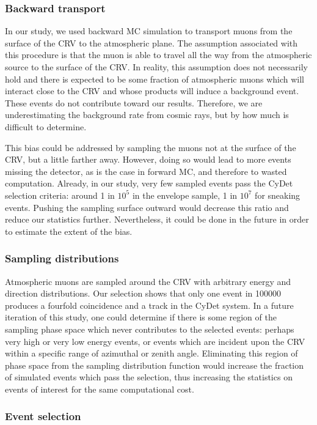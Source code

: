 \subsubsection{Backward transport}
In our study, we used backward MC simulation to transport muons from the surface
of the CRV to the atmospheric plane. The assumption associated with this
procedure is that the muon is able to travel all the way from the atmospheric
source to the surface of the CRV. In reality, this assumption does not
necessarily hold and there is expected to be some fraction of atmospheric muons
which will interact close to the CRV and whose products will induce a background
event. These events do not contribute toward our results. Therefore, we are
underestimating the background rate from cosmic rays, but by how much is
difficult to determine. 

This bias could be addressed by sampling the muons not at the surface of the
CRV, but a little farther away. However, doing so would lead to more events
missing the detector, as is the case in forward MC, and therefore to wasted
computation. Already, in our study, very few sampled events pass the CyDet
selection criteria: around 1 in $10^5$ in the envelope sample, 1 in $10^7$ for
sneaking events. Pushing the sampling surface outward would decrease this ratio
and reduce our statistics further. Nevertheless, it could be done in the future
in order to estimate the extent of the bias.

\subsubsection{Sampling distributions}

Atmospheric muons are sampled around the CRV with arbitrary energy and direction
distributions. Our selection shows that only one event in \num{100000} produces
a fourfold coincidence and a track in the CyDet system. In a future iteration of
this study, one could determine if there is some region of the sampling phase
space which never contributes to the selected events: perhaps very high or very
low energy events, or events which are incident upon the CRV within a specific
range of azimuthal or zenith angle. Eliminating this region of phase space from
the sampling distribution function would increase the fraction of simulated
events which pass the selection, thus increasing the statistics on events of
interest for the same computational cost.


\subsubsection{Event selection}

